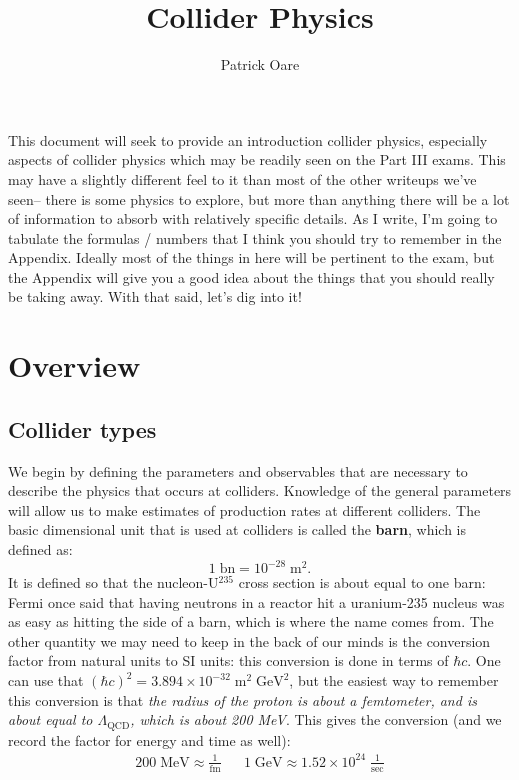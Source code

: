 \documentclass[11pt, oneside]{article}   	%
\title{Collider Physics}
\author{Patrick Oare}
\date{}							%
\theoremstyle{definition}
\numberwithin{equation}{subsection}		%
\begin{document}
\maketitle

This document will seek to provide an introduction collider physics, especially aspects of collider physics which may be readily seen on the 
Part III exams. This may have a slightly different feel to it than most of the other writeups we've seen-- there is some physics to explore, but 
more than anything there will be a lot of information to absorb with relatively specific details. As I write, I'm going to tabulate the formulas / 
numbers that I think you should try to remember in the Appendix. Ideally most of the things in here will be pertinent to the exam, but the 
Appendix will give you a good idea about the things that you should really be taking away. With that said, let's dig into it!

\section{Overview}

\subsection{Collider types}
We begin by defining the parameters and observables that are necessary to describe the physics that occurs at colliders. 
Knowledge of the general parameters will allow us to make estimates of production rates at different colliders. The basic dimensional 
unit that is used at colliders is called the \textbf{barn}, which is defined as:
\begin{equation}
	1\;\mathrm{bn} = 10^{-28}\;\mathrm{m}^2.
\end{equation}
It is defined so that the nucleon-U$^{235}$ cross section is about equal to one barn: Fermi once said that having neutrons in a reactor hit 
a uranium-235 nucleus was as easy as hitting the side of a barn, which is where the name comes from. The other quantity we may need 
to keep in the back of our minds is the conversion factor from natural units to SI units: this conversion is done in terms of $\hbar c$. 
One can use that $(\hbar c)^2 = 3.894\times 10^{-32}\;\mathrm{m}^2\;\mathrm{GeV}^2$, but the easiest way to remember this conversion 
is that \textit{the radius of the proton is about a femtometer, and is about equal to $\Lambda_{\mathrm{QCD}}$, which is about 200 MeV}. This 
gives the conversion (and we record the factor for energy and time as well):
\begin{align}
	200\;\mathrm{MeV}\approx \frac{1}{\mathrm{fm}} && 1 \;\mathrm{GeV} \approx 1.52\times 10^{24}\;\frac{1}{\mathrm{sec}}
\end{align}
\end{document}
